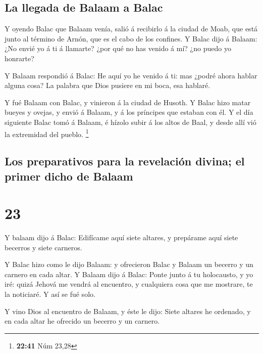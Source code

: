 \hypertarget{la-llegada-de-balaam-a-balac}{%
\subsection{La llegada de Balaam a
Balac}\label{la-llegada-de-balaam-a-balac}}

 Y oyendo Balac que Balaam venía, salió á recibirlo á la
ciudad de Moab, que está junto al término de Arnón, que es el cabo de
los confines.  Y Balac dijo á Balaam: ¿No envié yo á ti á
llamarte? ¿por qué no has venido á mí? ¿no puedo yo honrarte?

 Y Balaam respondió á Balac: He aquí yo he venido á ti: mas
¿podré ahora hablar alguna cosa? La palabra que Dios pusiere en mi boca,
esa hablaré.

 Y fué Balaam con Balac, y vinieron á la ciudad de Husoth.
 Y Balac hizo matar bueyes y ovejas, y envió á Balaam, y á
los príncipes que estaban con él.  Y el día siguiente Balac
tomó á Balaam, é hízolo subir á los altos de Baal, y desde allí vió la
extremidad del pueblo. \footnote{\textbf{22:41} Núm 23,28}

\hypertarget{los-preparativos-para-la-revelaciuxf3n-divina-el-primer-dicho-de-balaam}{%
\subsection{Los preparativos para la revelación divina; el primer dicho
de
Balaam}\label{los-preparativos-para-la-revelaciuxf3n-divina-el-primer-dicho-de-balaam}}

\hypertarget{section-22}{%
\section{23}\label{section-22}}

 Y balaam dijo á Balac: Edifícame aquí siete altares, y
prepárame aquí siete becerros y siete carneros.

 Y Balac hizo como le dijo Balaam: y ofrecieron Balac y
Balaam un becerro y un carnero en cada altar.  Y Balaam dijo
á Balac: Ponte junto á tu holocausto, y yo iré: quizá Jehová me vendrá
al encuentro, y cualquiera cosa que me mostrare, te la noticiaré. Y así
se fué solo.

 Y vino Dios al encuentro de Balaam, y éste le dijo: Siete
altares he ordenado, y en cada altar he ofrecido un becerro y un
carnero.

